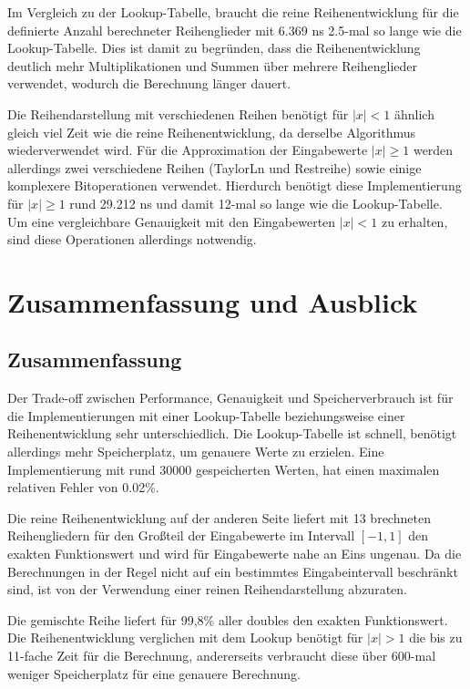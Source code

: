 \documentclass[course=erap] {aspdoc}
\begin{document}
{    Im Vergleich zu der Lookup-Tabelle, braucht die reine Reihenentwicklung für die definierte Anzahl berechneter Reihenglieder mit 6.369 ns 2.5-mal so lange wie die Lookup-Tabelle.
    Dies ist damit zu begründen, dass die Reihenentwicklung deutlich mehr Multiplikationen und Summen über mehrere Reihenglieder verwendet, wodurch die Berechnung länger dauert.

    Die Reihendarstellung mit verschiedenen Reihen benötigt für $|x|<1$ ähnlich gleich viel Zeit wie die reine Reihenentwicklung, da derselbe Algorithmus wiederverwendet wird.
    Für die Approximation der Eingabewerte $|x|\geq1$ werden allerdings zwei verschiedene Reihen (TaylorLn und Restreihe) sowie einige komplexere Bitoperationen verwendet.
    Hierdurch benötigt diese Implementierung für $|x|\geq1$ rund 29.212 ns und damit 12-mal so lange wie die Lookup-Tabelle.
    Um eine vergleichbare Genauigkeit mit den Eingabewerten $|x|<1$ zu erhalten, sind diese Operationen allerdings notwendig.


    \section{Zusammenfassung und Ausblick}\label{sec:zusammenfassung-und-ausblick}

    \subsection{Zusammenfassung}\label{subsec:zusammenfassung}

    Der Trade-off zwischen Performance, Genauigkeit und Speicherverbrauch ist für die Implementierungen mit einer Lookup-Tabelle beziehungsweise einer Reihenentwicklung sehr unterschiedlich.
    Die Lookup-Tabelle ist schnell, benötigt allerdings mehr Speicherplatz, um genauere Werte zu erzielen.
    Eine Implementierung mit rund 30000 gespeicherten Werten, hat einen maximalen relativen Fehler von 0.02\%.

    Die reine Reihenentwicklung auf der anderen Seite liefert mit 13 brechneten Reihengliedern für den Großteil der Eingabewerte im Intervall $[-1, 1]$ den exakten Funktionswert und wird für Eingabewerte nahe an Eins ungenau.
    Da die Berechnungen in der Regel nicht auf ein bestimmtes Eingabeintervall beschränkt sind, ist von der Verwendung einer reinen Reihendarstellung abzuraten.
    

    Die gemischte Reihe liefert für 99,8\% aller doubles den exakten Funktionswert.
    Die Reihenentwicklung verglichen mit dem Lookup benötigt für $|x|>1$ die bis zu 11-fache Zeit für die Berechnung, andererseits verbraucht diese über 600-mal weniger Speicherplatz für eine genauere Berechnung.


}
\end{document}
